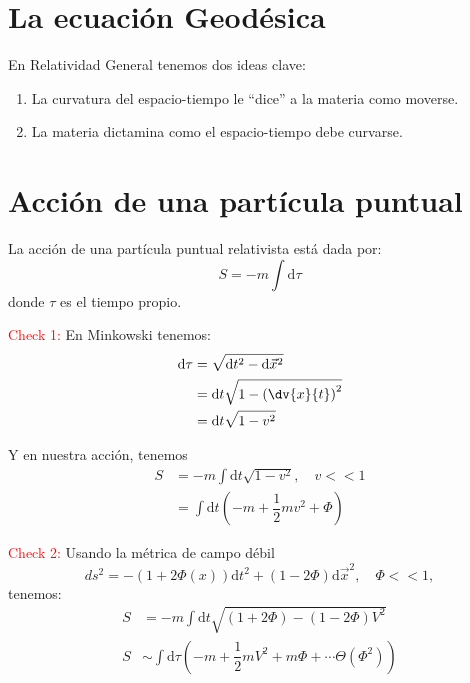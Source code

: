 \documentclass[../main]{subfiles}
\begin{document}
\section{La ecuación Geodésica}

En Relatividad General tenemos dos ideas clave: 
\begin{enumerate}
    \item La curvatura del espacio-tiempo le ``dice'' a la materia como moverse.
    \item La materia dictamina como el espacio-tiempo debe curvarse.
\end{enumerate}

\section{Acción de una partícula puntual}

La acción de una partícula puntual relativista está dada por:
\begin{equation}
    S=-m \int \mathrm{d}\tau
\end{equation}
donde $\tau$ es el tiempo propio. 

\textcolor{red}{Check 1:} En Minkowski tenemos: 
\begin{equation}
    \begin{split}
        \mathrm{d}\tau&=\sqrt{\mathrm{d}t^2-\mathrm{d}\vec{x}^2}\\
        &=\mathrm{d}t\sqrt{1-\left(\dv{x}{t}\right)^2} \\
        &=\mathrm{d}t\sqrt{1-v^2}
    \end{split}
\end{equation}

Y en nuestra acción, tenemos 
\begin{equation}
    \begin{split}
        S&=-m \int \mathrm{d}t\sqrt{1-v^2},\quad v<<1 \\
        &=\int \mathrm{d}t\left(-m+\dfrac{1}{2}mv^2+\Phi\right)        
    \end{split}
\end{equation}

\textcolor{red}{Check 2:} Usando la métrica de campo débil
\begin{equation}
    ds^2=-(1+2\Phi(x))\mathrm{d}t^2+(1-2\Phi)\mathrm{d}\vec{x}^2,\quad \Phi<<1,
\end{equation}
tenemos:
\begin{equation}
    \begin{split}
        S&=-m\int \mathrm{d}t \sqrt{(1+2\Phi)-(1-2\Phi)V^2} \\
        S&\sim \int \mathrm{d}\tau \left(-m+\dfrac{1}{2}mV^2+m\Phi+\cdots \Theta(\Phi^2)\right) 
    \end{split}
\end{equation}
\end{document}
